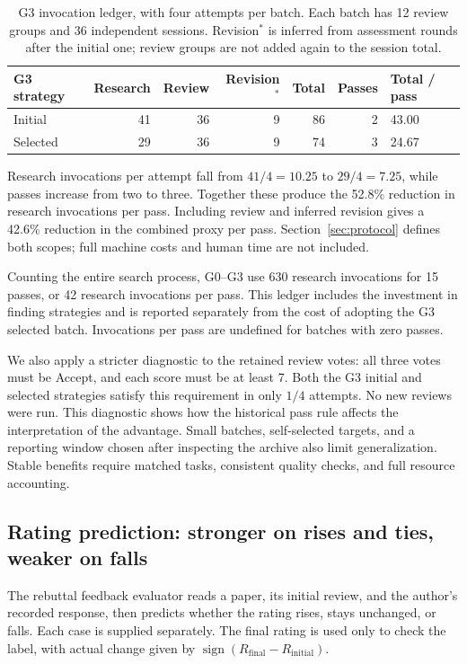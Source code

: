 \begin{table}[H]
\centering\small\setlength{\tabcolsep}{3pt}
\begin{tabularx}{\textwidth}{P{22mm}rrrrrY}
\toprule
{}
\textbf{G3 strategy} & \textbf{Research} & \textbf{Review} & \textbf{Revision$^*$} & \textbf{Total} & \textbf{Passes} & \textbf{Total / pass}\\
\midrule
Initial & 41 & 36 & 9 & 86 & 2 & 43.00\\
Selected & 29 & 36 & 9 & 74 & 3 & 24.67\\
\bottomrule
\end{tabularx}
\caption{G3 invocation ledger, with four attempts per batch. Each batch has 12 review groups and 36 independent sessions. Revision$^*$ is inferred from assessment rounds after the initial one; review groups are not added again to the session total.}
\label{tab:cost}
\end{table}

Research invocations per attempt fall from $41/4=10.25$ to $29/4=7.25$, while passes increase from two to three. Together these produce the 52.8\% reduction in research invocations per pass. Including review and inferred revision gives a 42.6\% reduction in the combined proxy per pass. Section~\ref{sec:protocol} defines both scopes; full machine costs and human time are not included.

Counting the entire search process, G0--G3 use 630 research invocations for 15 passes, or 42 research invocations per pass. This ledger includes the investment in finding strategies and is reported separately from the cost of adopting the G3 selected batch. Invocations per pass are undefined for batches with zero passes.

We also apply a stricter diagnostic to the retained review votes: all three votes must be Accept, and each score must be at least 7. Both the G3 initial and selected strategies satisfy this requirement in only $1/4$ attempts. No new reviews were run. This diagnostic shows how the historical pass rule affects the interpretation of the advantage. Small batches, self-selected targets, and a reporting window chosen after inspecting the archive also limit generalization. Stable benefits require matched tasks, consistent quality checks, and full resource accounting.

\FloatBarrier
\Needspace{180mm}
\subsection{Rating prediction: stronger on rises and ties, weaker on falls}
\label{sec:rebuttal-results}
The rebuttal feedback evaluator reads a paper, its initial review, and the author's recorded response, then predicts whether the rating rises, stays unchanged, or falls. Each case is supplied separately. The final rating is used only to check the label, with actual change given by $\operatorname{sign}(R_{\mathrm{final}}-R_{\mathrm{initial}})$.

